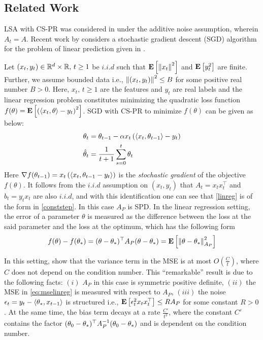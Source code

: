 \subsection{Related Work}
LSA with CS-PR was considered in \cite{polyak-judisky} under the additive noise assumption, wherein $A_t=A$. Recent work by \cite{bach} considers a stochastic gradient descent (SGD) algorithm for the problem of linear prediction given in .
\begin{example}\label{ex:linreg}
Let $(x_t,y_t)\in \mathbb{R}^d\times \mathbb{R},\,t\geq 1$ be $i.i.d$ such that $\mathbf{E}\left[\left\| x_t\right\|^2\right]$ and $\mathbf{E}\left[y_t^2\right]$ are finite. Further, we assume bounded data i.e., $\left\| (x_t,y_t)\right\|^2\leq B$ for some positive real number $B>0$. Here, $x_t,\,t\geq 1$ are the features and $y_t$ are real labels and the linear regression problem constitutes minimizing the quadratic loss function $f(\theta)=\mathbf{E}\left[\left(\langle x_t,\theta\rangle-y_t\right)^2\right]$. SGD with CS-PR to minimize $f(\theta)$ can be given as below:
\begin{subequations}\label{eq:linreg}
\begin{align}
\theta_t&=\theta_{t-1}-\alpha x_t\left(\langle x_t,\theta_{t-1}\rangle -y_t\right)\\
\hat{\theta}_t&=\frac{1}{t+1}\sum_{s=0}^t \theta_t
\end{align}
\end{subequations}
Here $\nabla f(\theta_{t-1})=x_t\left(\langle x_t,\theta_{t-1} -y_t\rangle\right)$ is the \emph{stochastic gradient} of the objective $f(\theta)$. It follows from the $i.i.d$ assumption on $(x_t,y_t)$ that $A_t=x_t x_t^\top$ and $b_t=y_t x_t$ are also $i.i.d$, and with this identification one can see that \eqref{linreg} is of the form in \eqref{conststep}. In this case $A_P$ is SPD.
In the linear regression setting, the error of a parameter $\theta$ is measured as the difference between the loss at the said parameter and the loss at the optimum, which has the following form
\begin{align}\label{eq:mselinreg}
f(\theta)-f(\theta_*)=(\theta-\theta_*)^\top A_P (\theta-\theta_*)=\mathbf{E}\left[\left\| \theta-\theta_*\right\|^2_{A_P}\right]
\end{align}
\end{example}
In this setting, \cite{bach} show that the variance term in the MSE is at most $O(\frac{C}{t})$, where $C$ does not depend on the condition number. This ``remarkable'' result is due to the following facts: $(i)$ $A_P$ in this case is symmetric positive definite, $(ii)$ the MSE in \eqref{eq:mselinreg} is measured with respect to $A_P$, $(iii)$ the noise $\epsilon_t=y_t-\langle\theta_*,x_{t-1}\rangle$ is structured i.e., $\mathbf{E}\left[\epsilon_t^2 x_t x_t^\top\right]\leq R A_P$ for some constant $R>0$.
At the same time, the bias term decays at a rate $\frac{C'}{t^2}$, where the constant $C'$ contains the factor $(\theta_0-\theta_*)^\top A^{-1}_P (\theta_0-\theta_*)$ and is dependent on the condition number.
